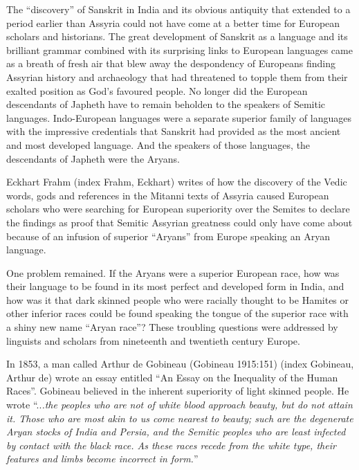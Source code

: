 The “discovery” of Sanskrit in India and its obvious antiquity that extended to a period earlier than Assyria could not have come at a better time for European scholars and historians. The great development of Sanskrit as a language and its brilliant grammar combined with its surprising links to European languages came as a breath of fresh air that blew away the despondency of Europeans finding Assyrian history and archaeology that had threatened to topple them from their exalted position as God's favoured people. No longer did the European descendants of Japheth have to remain beholden to the speakers of Semitic languages. Indo-European languages were a separate superior family of languages with the impressive credentials that Sanskrit had provided as the most ancient and most developed language. And the speakers of those languages, the descendants of Japheth were the Aryans.

\newpage

Eckhart Frahm (index Frahm, Eckhart) writes of how the discovery of the Vedic words, gods and references in the Mitanni texts of Assyria caused European scholars who were searching for European superiority over the Semites to declare the findings as proof that Semitic Assyrian greatness could only have come about because of an infusion of superior “Aryans” from Europe speaking an Aryan language.

One problem remained. If the Aryans were a superior European race, how was their language to be found in its most perfect and developed form in India, and how was it that dark skinned people who were racially thought to be Hamites or other inferior races could be found speaking the tongue of the superior race with a shiny new name “Aryan race”? These troubling questions were addressed by linguists and scholars from nineteenth and twentieth century Europe.

In 1853, a man called Arthur de Gobineau (Gobineau 1915:151) (index Gobineau, Arthur de) wrote an essay entitled “An Essay on the Inequality of the Human Races”. Gobineau believed in the inherent superiority of light skinned people. He wrote “..\textit{.the peoples who are not of white blood approach beauty, but do not attain it. Those who are most akin to us come nearest to beauty; such are the degenerate Aryan stocks of India and Persia, and the Semitic peoples who are least infected by contact with the black race. As these races recede from the white type, their features and limbs become incorrect in form.}”

